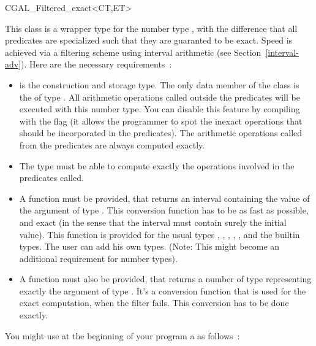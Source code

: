 \begin{ccClass} {CGAL_Filtered_exact<CT,ET>}
\label{filter}

This class is a wrapper type for the number type , with the difference
that all predicates are specialized such that they are guaranted to be exact.
Speed is achieved via a filtering scheme using interval arithmetic (see
Section~\ref{interval-adv}).  Here are the necessary requirements~:

\begin{itemize}
\item {} is the construction and storage type.  The only data member of
      the class  is the  of type
      .
      All arithmetic operations called
      outside the predicates will be executed with this number type.  You can
      disable this feature by compiling with the flag
       (it allows the programmer
      to spot the inexact operations that should be incorporated in the
      predicates).
      The arithmetic operations called from the predicates are always computed
      exactly.
\item The  type must be able to compute exactly the operations involved
      in the predicates called.
\item A  function must
      be provided, that returns an interval containing the value of the
      argument of type .
      This conversion function has to be as fast as possible, and exact (in the
      sense that the interval must contain surely the initial value).  This
      function is provided for the usual types , ,
      , , , and the
      builtin types.  The user can add his own types.  (Note: This might become
      an additional requirement for number types).
\item A  function must also be provided, that
      returns a number of type  representing exactly the argument of
      type .  It's a conversion function that is used for the exact
      computation, when the filter fails.
      This conversion has to be done exactly.
\end{itemize}

\ccExample

You might use at the beginning of your program a  as follows~:


\end{ccClass}
